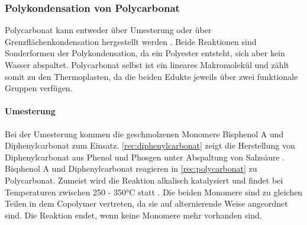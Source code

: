 \subsubsection{Polykondensation von Polycarbonat}

Polycarbonat kann entweder über Umesterung oder über Grenzflächenkondensation
hergestellt werden \cite{cuzpe}. Beide Reaktionen sind Sonderformen der
Polykondensation, da ein Polyester entsteht, sich aber kein Wasser abspaltet.
Polycarbonat selbst ist ein lineares Makromolekül und zählt somit zu den
Thermoplasten, da die beiden Edukte jeweils über zwei funktionale Gruppen
verfügen.

\paragraph{Umesterung} Bei der Umesterung kommen die geschmolzenen Monomere
Bisphenol A und Diphenylcarbonat zum Einsatz. \autoref{rec:diphenylcarbonat}
zeigt die Herstellung von Diphenylcarbonat aus Phenol und Phosgen unter
Abspaltung von Salzsäure \cite{cuzpe}. Bisphenol A und Diphenylcarbonat
reagieren in \autoref{rec:polycarbonat} zu Polycarbonat. Zumeist wird die
Reaktion alkalisch katalysiert und findet bei Temperaturen zwischen 250 - 350°C
statt \cite{pop}. Die beiden Monomere sind zu gleichen Teilen in dem Copolymer
vertreten, da sie auf alternierende Weise angeordnet sind. Die Reaktion endet,
wenn keine Monomere mehr vorhanden sind.

